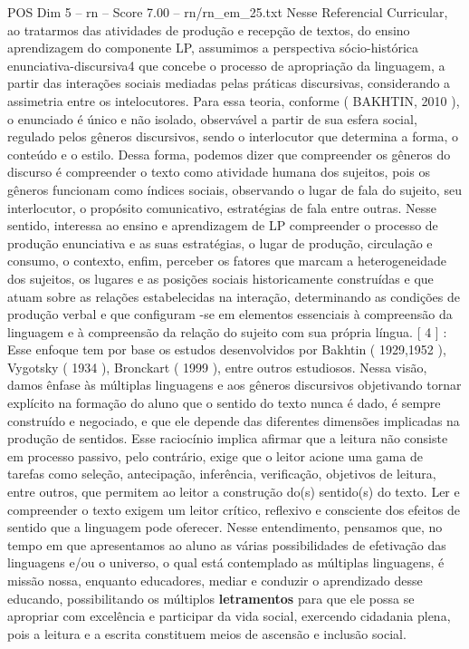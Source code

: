 \begin{textsample}{POS Dim 5 – rn – Score 7.00 – rn/rn\_em\_25.txt}
Nesse Referencial Curricular, ao tratarmos das atividades de produção e recepção de textos, do ensino aprendizagem do componente LP, assumimos a perspectiva sócio-histórica enunciativa-discursiva4 que concebe o processo de apropriação da linguagem, a partir das interações sociais mediadas pelas práticas discursivas, considerando a assimetria entre os intelocutores.
Para essa teoria, conforme ( BAKHTIN, 2010 ), o enunciado é único e não isolado, observável a partir de sua esfera social, regulado pelos gêneros discursivos, sendo o interlocutor que determina a forma, o conteúdo e o estilo.
Dessa forma, podemos dizer que compreender os gêneros do discurso é compreender o texto como atividade humana dos sujeitos, pois os gêneros funcionam como índices sociais, observando o lugar de fala do sujeito, seu interlocutor, o propósito comunicativo, estratégias de fala entre outras.
Nesse sentido, interessa ao ensino e aprendizagem de LP compreender o processo de produção enunciativa e as suas estratégias, o lugar de produção, circulação e consumo, o contexto, enfim, perceber os fatores que marcam a heterogeneidade dos sujeitos, os lugares e as posições sociais historicamente construídas e que atuam sobre as relações estabelecidas na interação, determinando as condições de produção verbal e que configuram -se em elementos essenciais à compreensão da linguagem e à compreensão da relação do sujeito com sua própria língua. [ 4 ] : Esse enfoque tem por base os estudos desenvolvidos por Bakhtin ( 1929,1952 ), Vygotsky ( 1934 ), Bronckart ( 1999 ), entre outros estudiosos.
Nessa visão, damos ênfase às múltiplas linguagens e aos gêneros discursivos objetivando tornar explícito na formação do aluno que o sentido do texto nunca é dado, é sempre construído e negociado, e que ele depende das diferentes dimensões implicadas na produção de sentidos.
Esse raciocínio implica afirmar que a leitura não consiste em processo passivo, pelo contrário, exige que o leitor acione uma gama de tarefas como seleção, antecipação, inferência, verificação, objetivos de leitura, entre outros, que permitem ao leitor a construção do(s) sentido(s) do texto.
Ler e compreender o texto exigem um leitor crítico, reflexivo e consciente dos efeitos de sentido que a linguagem pode oferecer.
Nesse entendimento, pensamos que, no tempo em que apresentamos ao aluno as várias possibilidades de efetivação das linguagens e/ou o universo, o qual está contemplado as múltiplas linguagens, é missão nossa, enquanto educadores, mediar e conduzir o aprendizado desse educando, possibilitando os múltiplos \textbf{letramentos} para que ele possa se apropriar com excelência e participar da vida social, exercendo cidadania plena, pois a leitura e a escrita constituem meios de ascensão e inclusão social.

\end{textsample}
